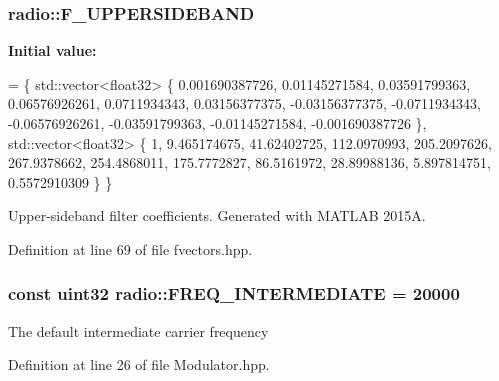 \hypertarget{namespaceradio_a0ec4548711b6d6ed6867c70b3fc2a413}{
\subsubsection[{F\+\_\+\+U\+P\+P\+E\+R\+S\+I\+D\+E\+B\+A\+N\+D}]{ radio\+::\+F\+\_\+\+U\+P\+P\+E\+R\+S\+I\+D\+E\+B\+A\+N\+D}}\label{namespaceradio_a0ec4548711b6d6ed6867c70b3fc2a413}
{\bfseries Initial value\+:}
\begin{DoxyCode}
= \{ std::vector<float32> \{
        0.001690387726,
            0.01145271584,
            0.03591799363,
            0.06576926261,
            0.0711934343,
            0.03156377375,
            -0.03156377375,
            -0.0711934343,
            -0.06576926261,
            -0.03591799363,
            -0.01145271584,
            -0.001690387726
    \}, std::vector<float32> \{
        1,
            9.465174675,
            41.62402725,
            112.0970993,
            205.2097626,
            267.9378662,
            254.4868011,
            175.7772827,
            86.5161972,
            28.89988136,
            5.897814751,
            0.5572910309
    \} \}
\end{DoxyCode}
Upper-\/sideband filter coefficients. Generated with M\+A\+T\+L\+A\+B 2015\+A. 

Definition at line 69 of file fvectors.\+hpp.

\hypertarget{namespaceradio_aa82ddc6ba206798fd70ffc25665b3cb6}{
\subsubsection[{F\+R\+E\+Q\+\_\+\+I\+N\+T\+E\+R\+M\+E\+D\+I\+A\+T\+E}]{\setlength{\rightskip}{0pt plus 5cm}const {\bf uint32} radio\+::\+F\+R\+E\+Q\+\_\+\+I\+N\+T\+E\+R\+M\+E\+D\+I\+A\+T\+E = 20000}}\label{namespaceradio_aa82ddc6ba206798fd70ffc25665b3cb6}
The default intermediate carrier frequency 

Definition at line 26 of file Modulator.\+hpp.

